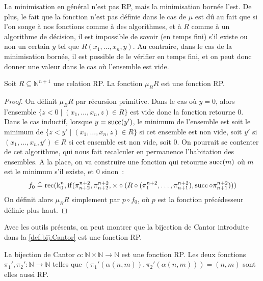 La minimisation en général n'est pas RP, mais la minimisation bornée l'est. De
plus, le fait que la fonction n'est pas définie dans le cas de $\mu$ est dû
au fait que si l'on songe à nos fonctions comme à des algorithmes, et à $R$
comme à un algorithme de décision, il est impossible de savoir (en temps fini)
s'il existe ou non un certain $y$ tel que $R(x_1,\ldots,x_n,y)$. Au contraire,
dans le cas de la minimisation bornée, il est possible de le vérifier en temps
fini, et on peut donc donner une valeur dans le cas où l'ensemble est vide.

\begin{proposition}
  Soit $R\subseteq \mathbb N^{n+1}$ une relation RP. La fonction $\mu_B R$ est
  une fonction RP.
\end{proposition}

\begin{proof}
  On définit $\mu_B R$ par récursion primitive. Dans le cas où $y = 0$, alors
  l'ensemble $\{ z < 0 \mid (x_1,\ldots,x_n,z) \in R\}$ est vide donc la
  fonction retourne $0$. Dans le cas inductif, lorsque $y = \operatorname{succ}(y')$, le
  minimum de l'ensemble est soit le minimum de
  $\{ z < y' \mid (x_1,\ldots,x_n,z)\in R\}$ si cet ensemble est non vide, soit
  $y'$ si $(x_1,\ldots,x_n,y') \in R$ si cet ensemble est non vide, soit $0$. On
  pourrait se contenter de cet algorithme, qui nous fait recalculer en
  permanence l'habitation des ensembles. A la place, on va construire une
  fonction qui retourne $\operatorname{succ}(m)$ où $m$ est le minimum s'il existe, et $0$
  sinon~:
  \[f_0 \triangleq \operatorname{rec}(\operatorname{k}_0^n,\operatorname{if}(\pi_{n+2}^{n+2},\pi_{n+2}^{n+2},
  \times\circ(R\circ(\pi_1^{n+2},\ldots,\pi_{n+1}^{n+2}),
  \operatorname{succ}\circ \pi_{n+1}^{n+2})))\]
  On définit alors $\mu_B R$ simplement par $p\circ f_0$, où $p$ est la
  fonction précédesseur définie plus haut.
\end{proof}

Avec les outils présents, on peut montrer que la bijection de Cantor introduite
dans la \cref{def.bij.Cantor} est une fonction RP.

\begin{proposition}
  La bijection de Cantor $\alpha : \mathbb N \times \mathbb N \to \mathbb N$
  est une fonction RP. Les deux fonctions
  $\pi_1',\pi_2' : \mathbb N \to \mathbb N$ telles que
  $(\pi_1'(\alpha(n,m)),\pi_2'(\alpha(n,m))) = (n,m)$ sont elles aussi RP.
\end{proposition}

